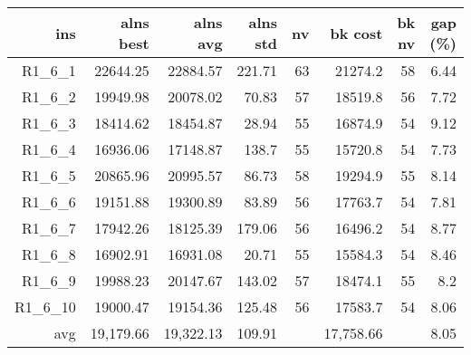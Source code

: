   \begin{table}[caption={Kết quả đo với tập HG\_R\_1\_6 600 yêu cầu}, label=exp:HGR16]
    \centering
    \begin{tabular}{rrrrrrrr}
    \hline
    ins & alns best & alns avg & alns std & nv & bk cost & bk nv & gap (\%) \\ \hline
    R1\_6\_1 & 22644.25 & 22884.57 & 221.71 & 63 & 21274.2 & 58 & 6.44 \\ \hline
    R1\_6\_2 & 19949.98 & 20078.02 & 70.83 & 57 & 18519.8 & 56 & 7.72 \\ \hline
    R1\_6\_3 & 18414.62 & 18454.87 & 28.94 & 55 & 16874.9 & 54 & 9.12 \\ \hline
    R1\_6\_4 & 16936.06 & 17148.87 & 138.7 & 55 & 15720.8 & 54 & 7.73 \\ \hline
    R1\_6\_5 & 20865.96 & 20995.57 & 86.73 & 58 & 19294.9 & 55 & 8.14 \\ \hline
    R1\_6\_6 & 19151.88 & 19300.89 & 83.89 & 56 & 17763.7 & 54 & 7.81 \\ \hline
    R1\_6\_7 & 17942.26 & 18125.39 & 179.06 & 56 & 16496.2 & 54 & 8.77 \\ \hline
    R1\_6\_8 & 16902.91 & 16931.08 & 20.71 & 55 & 15584.3 & 54 & 8.46 \\ \hline
    R1\_6\_9 & 19988.23 & 20147.67 & 143.02 & 57 & 18474.1 & 55 & 8.2 \\ \hline
    R1\_6\_10 & 19000.47 & 19154.36 & 125.48 & 56 & 17583.7 & 54 & 8.06 \\ \hline
    avg & 19,179.66 & 19,322.13 & 109.91 & & 17,758.66 & & 8.05 \\ \hline
    \end{tabular}
  \end{table}

